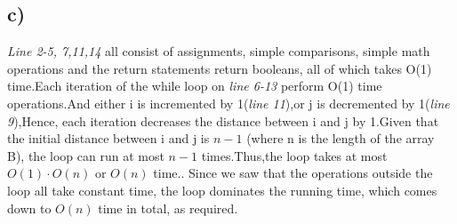 \documentclass[12pt]{article}
\begin{document}
\subsection*{c)}

\textit{Line 2-5, 7,11,14} all consist of assignments, simple comparisons, 
simple math operations and the return statements return booleans, all 
of which takes O(1) time.Each iteration of the while loop on 
\textit{line 6-13} perform O(1) time operations.And either i is incremented 
by 1(\textit{line 11}),or j is decremented by 1(\textit{line 9}),Hence, 
each iteration decreases the distance between i and j by 1.Given that 
the initial distance between i and j is $n - 1$ (where n is the length 
of the array B), the loop can run at most $n - 1$ times.Thus,the loop takes 
at most $O(1) \cdot O(n)$ or $O(n)$ time.. Since we saw that the operations 
outside the loop all take constant time, the loop dominates the running 
time, which comes down to $O(n)$ time in total, as required.
\end{document}

